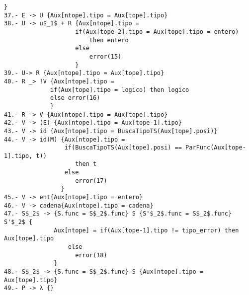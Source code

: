 \documentclass[a4paper, 12pt]{article}
\begin{document}
\begin{lstlisting}[style=EstadosAutomataST]
                    }
37.- E -> U {Aux[ntope].tipo = Aux[tope].tipo}
38.- U -> u$_1$ + R {Aux[ntope].tipo =
                    if(Aux[tope-2].tipo = Aux[tope].tipo = entero)
                        then entero
                    else
                        error(15)
                    }
39.- U-> R {Aux[ntope].tipo = Aux[tope].tipo}
40.- R _> !V {Aux[ntope].tipo =
             if(Aux[tope].tipo = logico) then logico
             else error(16)
             }
41.- R -> V {Aux[ntope].tipo = Aux[tope].tipo}
42.- V -> (E) {Aux[ntope].tipo = Aux[tope-1].tipo}
43.- V -> id {Aux[ntope].tipo = BuscaTipoTS(Aux[tope].posi)}
44.- V -> id(M) {Aux[ntope].tipo =
                 if(BuscaTipoTS(Aux[tope].posi) == ParFunc(Aux[tope-1].tipo, t))
                    then t
                 else
                    error(17)
                }
45.- V -> ent{Aux[ntope].tipo = entero}
46.- V -> cadena{Aux[ntope].tipo = cadena}
47.- S$_2$ -> {S.func = S$_2$.func} S {S'$_2$.func = S$_2$.func} S'$_2$ {
              Aux[ntope] = if(Aux[tope-1].tipo != tipo_error) then Aux[tope].tipo
                  else
                    error(18)
              }
48.- S$_2$ -> {S.func = S$_2$.func} S {Aux[ntope].tipo = Aux[tope].tipo}
49.- P -> λ {}

\end{lstlisting}
\end{document}
